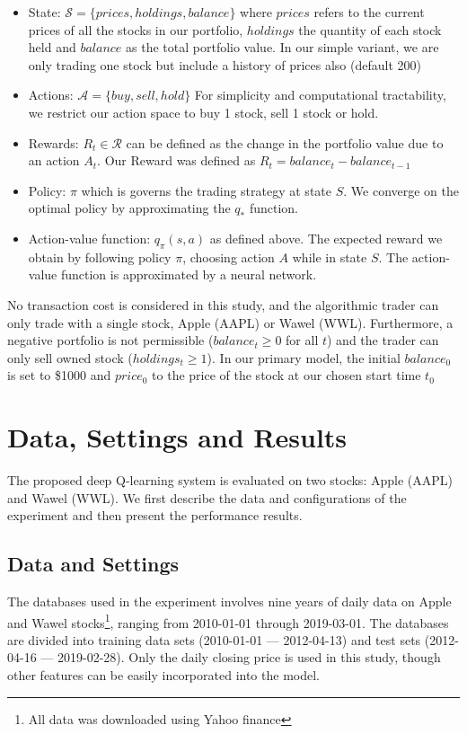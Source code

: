 \documentclass[12pt, authoryear]{elsarticle}
\begin{document}
\begin{itemize}
	\item State: $\mathcal{S} = \{prices,holdings,balance\} $ where $prices$ refers to the current prices of all the stocks in our portfolio, $holdings$ the quantity of each stock held and $balance$ as the total portfolio value. In our simple variant, we are only trading one stock but include a history of prices also (default 200)
	\item Actions: $\mathcal{A} = \{buy,sell,hold\}$ For simplicity and computational tractability, we restrict our action space to buy 1 stock, sell 1 stock or hold.
	\item Rewards: $R_{t} \in \mathcal{R}$ can be defined as the change in the portfolio value due to an action $A_{t}$. Our Reward was defined as $R_{t} = balance_{t} - balance_{t-1}$
	\item Policy: $\pi$ which is governs the trading strategy at state $S$. We converge on the optimal policy by approximating the $q_{*}$ function.
	\item Action-value function: $q_{\pi}(s,a)$ as defined above. The expected reward we obtain by following policy $\pi$, choosing action $A$ while in state $S$. The action-value function is approximated by a neural network.
\end{itemize}

No transaction cost is considered in this study, and the algorithmic trader can only trade with a single stock, Apple (AAPL) or Wawel (WWL). Furthermore, a negative portfolio is not permissible ($balance_{t} \geq 0$ for all $t$) and the trader can only sell owned stock ($holdings_{t} \geq 1$). In our primary model, the initial $balance_{0}$ is set to \$1000 and $price_{0}$ to the price of the stock at our chosen start time $t_{0}$ 

\section{Data, Settings and  Results}

The proposed deep Q-learning system is evaluated on two stocks: Apple (AAPL) and Wawel (WWL). We first describe the data and configurations of the experiment and then present the performance results.

\subsection{Data and Settings}

The databases used in the experiment involves nine years of daily data on Apple and Wawel stocks\footnote{All data was downloaded using Yahoo finance}, ranging from  2010-01-01 through 2019-03-01. The databases are divided into training data sets (2010-01-01 --- 2012-04-13) and test sets (2012-04-16 --- 2019-02-28). Only the daily closing price is used in this study, though other features can be easily incorporated into the model.
\end{document}
